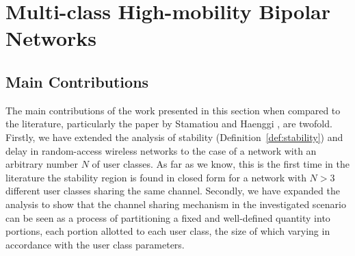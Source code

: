 \section{Multi-class High-mobility Bipolar Networks} \label{sec:N-class}

\subsection{Main Contributions}
The main contributions of the work presented in this section when compared to the literature, particularly the paper by Stamatiou and Haenggi \cite{stamatiou2010random}, are twofold.
%
Firstly, we have extended the analysis of stability (Definition~\ref{def:stability}) and delay in random-access wireless networks to the case of a network with an arbitrary number $N$ of user classes. As far as we know, this is the first time in the literature the stability region is found in closed form for a network with $N > 3$ different user classes sharing the same channel.
%
Secondly, we have expanded the analysis to show that the channel sharing mechanism in the investigated scenario can be seen as a process of partitioning a fixed and well-defined quantity into portions, each portion allotted to each user class, the size of which varying in accordance with the user class parameters.

